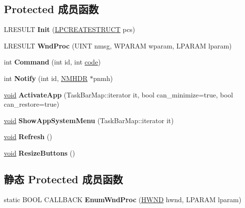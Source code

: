\subsection*{Protected 成员函数}
\begin{DoxyCompactItemize}
\item 
\mbox{\label{struct_task_bar_a6cf5e25751e15492693770a4a79003fb}} 
L\+R\+E\+S\+U\+LT {\bfseries Init} (\hyperlink{structtag_c_r_e_a_t_e_s_t_r_u_c_t_a}{L\+P\+C\+R\+E\+A\+T\+E\+S\+T\+R\+U\+CT} pcs)
\item 
\mbox{\label{struct_task_bar_ae158d4cdb75646680c52e29dfdf8ed13}} 
L\+R\+E\+S\+U\+LT {\bfseries Wnd\+Proc} (U\+I\+NT nmsg, W\+P\+A\+R\+AM wparam, L\+P\+A\+R\+AM lparam)
\item 
\mbox{\label{struct_task_bar_a5f9fe765661d6a47bc27453f995e91ec}} 
int {\bfseries Command} (int id, int \hyperlink{structcode}{code})
\item 
\mbox{\label{struct_task_bar_ae4c0a44b6d177c0264913f15aaadd788}} 
int {\bfseries Notify} (int id, \hyperlink{structtag_n_m_h_d_r}{N\+M\+H\+DR} $\ast$pnmh)
\item 
\mbox{\label{struct_task_bar_a016010cc686f8ce5b8e414e994cfc0f4}} 
\hyperlink{interfacevoid}{void} {\bfseries Activate\+App} (Task\+Bar\+Map\+::iterator it, bool can\+\_\+minimize=true, bool can\+\_\+restore=true)
\item 
\mbox{\label{struct_task_bar_a93e3f7bd1cdad4db9c29e86e37ddd0ec}} 
\hyperlink{interfacevoid}{void} {\bfseries Show\+App\+System\+Menu} (Task\+Bar\+Map\+::iterator it)
\item 
\mbox{\label{struct_task_bar_ac9b8289d9c6c4bcb691c0386b7307c98}} 
\hyperlink{interfacevoid}{void} {\bfseries Refresh} ()
\item 
\mbox{\label{struct_task_bar_a6bd831eee60a0b190a4049a7e222eaad}} 
\hyperlink{interfacevoid}{void} {\bfseries Resize\+Buttons} ()
\end{DoxyCompactItemize}
\subsection*{静态 Protected 成员函数}
\begin{DoxyCompactItemize}
\item 
\mbox{\label{struct_task_bar_a5b8a40e4abce28611e0c48df4b859152}} 
static B\+O\+OL C\+A\+L\+L\+B\+A\+CK {\bfseries Enum\+Wnd\+Proc} (\hyperlink{interfacevoid}{H\+W\+ND} hwnd, L\+P\+A\+R\+AM lparam)
\end{DoxyCompactItemize}
